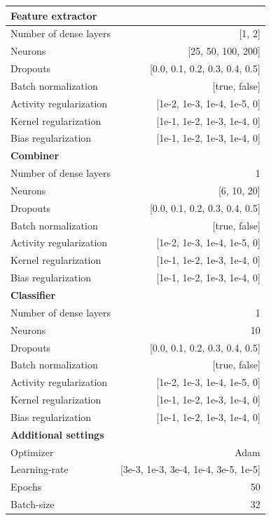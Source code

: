 \documentclass[preprint]{elsarticle}
\begin{document}
\renewcommand{\arraystretch}{1.2}
\begin{table}[H]
  \centering
  \scriptsize
\begin{adjustbox}{center}
\begin{tabular}{@{}lr@{}}
\textbf{Feature extractor}  & \\
\midrule
{Number of dense layers}    & [1, 2] \\
{Neurons}                   & [25, 50, 100, 200] \\
{Dropouts}                  & [0.0, 0.1, 0.2, 0.3, 0.4, 0.5] \\
{Batch normalization}       & [true, false] \\
{Activity regularization}   & [1e-2, 1e-3, 1e-4, 1e-5, 0] \\
{Kernel regularization}     & [1e-1, 1e-2, 1e-3, 1e-4, 0] \\
{Bias regularization}       & [1e-1, 1e-2, 1e-3, 1e-4, 0] \\
\midrule
\textbf{Combiner}           & \\
\midrule
{Number of dense layers}    & 1 \\
{Neurons}                   & [6, 10, 20] \\
{Dropouts}                  & [0.0, 0.1, 0.2, 0.3, 0.4, 0.5] \\
{Batch normalization}       & [true, false] \\
{Activity regularization}   & [1e-2, 1e-3, 1e-4, 1e-5, 0] \\
{Kernel regularization}     & [1e-1, 1e-2, 1e-3, 1e-4, 0] \\
{Bias regularization}       & [1e-1, 1e-2, 1e-3, 1e-4, 0] \\
\midrule
\textbf{Classifier}         & \\
\midrule
{Number of dense layers}    & 1 \\
{Neurons}                   & 10 \\
{Dropouts}                  & [0.0, 0.1, 0.2, 0.3, 0.4, 0.5] \\
{Batch normalization}       & [true, false] \\
{Activity regularization}   & [1e-2, 1e-3, 1e-4, 1e-5, 0] \\
{Kernel regularization}     & [1e-1, 1e-2, 1e-3, 1e-4, 0] \\
{Bias regularization}       & [1e-1, 1e-2, 1e-3, 1e-4, 0] \\
\midrule
\textbf{Additional settings} & \\
\midrule
Optimizer                   & Adam \\
Learning-rate               & [3e-3, 1e-3, 3e-4, 1e-4, 3e-5, 1e-5] \\
Epochs                      & 50 \\
Batch-size                  & 32 \\


\end{tabular}
\end{adjustbox}
\end{table}
\end{document}
